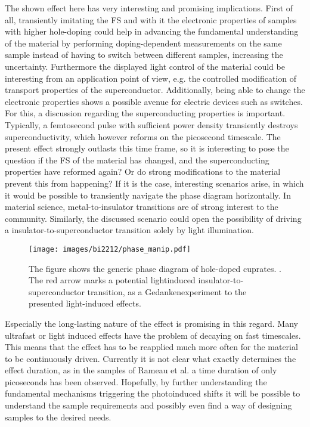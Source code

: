 The shown effect here has very interesting and promising implications.
First of all, transiently imitating the FS and with it the electronic properties of samples with higher hole-doping could help in advancing the fundamental understanding of the material by performing doping-dependent measurements on the same sample instead of having to switch between different samples, increasing the uncertainty.
Furthermore the displayed light control of the material could be interesting from an application point of view, e.g. the controlled modification of transport properties of the superconductor.
Additionally, being able to change the electronic properties shows a possible avenue for electric devices such as switches.
For this, a discussion regarding the superconducting properties is important.
Typically, a femtosecond pulse with sufficient power density transiently destroys superconductivity, which however reforms on the picosecond timescale.
The present effect strongly outlasts this time frame, so it is interesting to pose the question if the FS of the material has changed, and the superconducting properties have reformed again?
Or do strong modifications to the material prevent this from happening?
If it is the case, interesting scenarios arise, in which it would be possible to transiently navigate the phase diagram horizontally.
In material science, metal-to-insulator transitions are of strong interest to the community.
Similarly, the discussed scenario could open the possibility of driving a insulator-to-superconductor transition solely by light illumination.

\begin{figure}
	\centering
	\texttt{[image: images/bi2212/phase\_manip.pdf]}
	\caption{The figure shows the generic phase diagram of hole-doped cuprates. \cite{keimer_quantum_2015}. The red arrow marks a potential lightinduced insulator-to-superconductor transition, as a Gedankenexperiment to the presented light-induced effects.}
	\label{fig:phasemanip}
\end{figure}

Especially the long-lasting nature of the effect is promising in this regard.
Many ultrafast or light induced effects have the problem of decaying on fast timescales.
This means that the effect has to be reapplied much more often for the material to be continuously driven.
Currently it is not clear what exactly determines the effect duration, as in the samples of Rameau et al. \cite{rameau_photoinduced_2014} a time duration of only picoseconds has been observed.
Hopefully, by further understanding the fundamental mechanisms triggering the photoinduced shifts it will be possible to understand the sample requirements and possibly even find a way of designing samples to the desired needs.